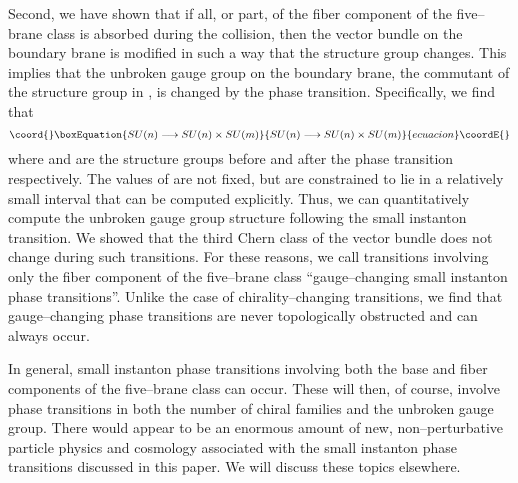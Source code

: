 \documentclass[a4paper,12pt]{article}
\numberwithin{equation}{section}
\theoremstyle{plain}
\begin{document}
Second, we have shown that if all, or part, of the fiber component of the
five--brane class is absorbed during the collision, then the vector bundle on
the boundary brane is modified in such a way that the structure group changes.
This implies that the unbroken gauge group on the boundary brane, the
commutant of the structure group in \coordHE{}, is changed by the phase
transition. Specifically, we find that
\begin{equation}\coord{}\boxEquation{
SU(n) \longrightarrow SU(n) \times SU(m)
\label{eq:221}
}{
SU(n) \longrightarrow SU(n) \times SU(m)
}{ecuacion}\coordE{}\end{equation}
where \coordHE{} and \coordHE{} are the structure groups before and
after the phase transition respectively. The values of \coordHE{} are not fixed, but
are constrained to lie in a relatively small interval that can be computed
explicitly. Thus, we can quantitatively compute the unbroken gauge group
structure following the small instanton transition. We showed that the third
Chern class of the vector bundle does not change during such transitions. For
these reasons, we call transitions involving only the fiber component of the
five--brane class ``gauge--changing small instanton phase transitions''.
Unlike the case of chirality--changing transitions, we find that
gauge--changing phase transitions are never topologically obstructed and can
always occur.

In general, small instanton phase transitions involving both the base and
fiber components of the five--brane class can occur. These will then, of
course, involve phase transitions in both the number of chiral families and
the unbroken gauge group. There would appear to be an enormous amount of new,
non--perturbative particle physics and cosmology associated with the small
instanton phase transitions discussed in this paper. We will discuss these
topics elsewhere. 
\end{document}
